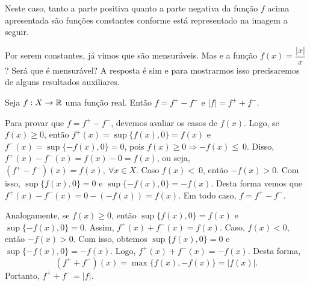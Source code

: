 Neste caso, tanto a parte positiva quanto a parte negativa da função $f$ acima apresentada são funções constantes
conforme está representado na imagem a seguir.\\

    \begin{figure}[h!]
	\centering
    \end{figure}    

    Por serem constantes, já vimos que são mensuráveis.
    Mas e a função $f(x) =\dfrac{|x|}{x}$? Será que é mensurável?
    A resposta é sim e para mostrarmos isso precisaremos de alguns resultados auxiliares. 
    \begin{lemma}
    \label{prop:decomposicao-da-funcao-em-partes-positiva-negativa}
        Seja $f: X \to \mathbb{R}$ uma função real. Então $f = f^+ - f^-$ e $|f| = f^+ + f^-$.
    \end{lemma}
    \begin{prova}
            Para provar que $f = f^+ - f^-$, devemos avaliar os casos de $f(x)$. 
            Logo, se $f(x) \geq 0$, então $f^+(x) = \sup\{f(x), 0\} = f(x)$ e $f^-(x) = \sup\{-f(x), 0\} = 0$, pois $f(x) \geq 0 \Rightarrow  - f(x) \leq~0$.
            Disso, $f^+(x) - f^-(x) = f(x) - 0 = f(x)$, ou seja, $(f^+ - f^-)(x) = f(x), \ \forall x \in X$.
            Caso $f(x) <~0$, então $- f(x) > 0$. 
            Com isso,  $\sup\{f(x), 0\} = 0$ e $\sup\{-f(x), 0\} = -f(x)$.
            Desta forma vemos que
            $f^+(x) - f^-(x) = 0 - (-f(x)) = f(x)$.
            Em todo caso, $f = f^+ - f^-$.

            Analogamente, se $f(x) \geq 0$, então  $\sup\{f(x), 0\} = f(x)$ e $\sup\{-f(x), 0\} = 0$.
            Assim, $f^+(x) + f^-(x) = f(x)$.
            Caso, $f(x) < 0$, então $ - f(x) > 0$.
            Com isso, obtemos $\sup\{f(x), 0\} = 0$ e $\sup\{-f(x), 0\} = -f(x)$.
            Logo, $f^+(x) + f^-(x) = -f(x)$.
            Desta forma, 
            $$
            (f^+ + f^-)(x) = \max\{f(x), -f(x)\} = |f(x)|.
            $$
            Portanto, $f^+ + f^- = |f|$.
    \end{prova}

